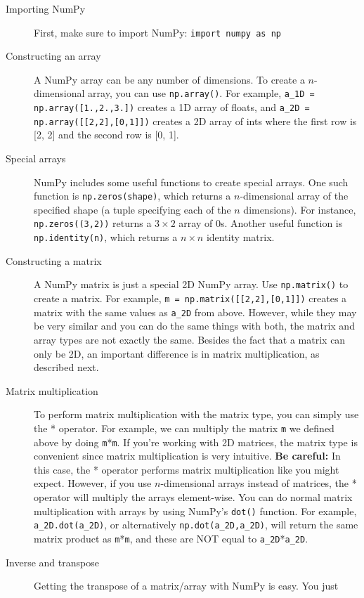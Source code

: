 \begin{description}
  \item[Importing NumPy] First, make sure to import NumPy: \texttt{import numpy as np}
  \item[Constructing an array] A NumPy array can be any number of dimensions. To create a
    $n$-dimensional array, you can use \texttt{np.array()}. For example, \texttt{a\_1D =
      np.array([1.,2.,3.])} creates a 1D array of floats, and \texttt{a\_2D =
    np.array([[2,2],[0,1]])} creates a 2D array of ints where the first row is [2, 2] and the second
    row is [0, 1].
  \item[Special arrays] NumPy includes some useful functions to create special arrays. One such
    function is \texttt{np.zeros(shape)}, which returns a $n$-dimensional array of the specified
    shape (a tuple specifying each of the $n$ dimensions). For instance, \texttt{np.zeros((3,2))}
    returns a $3 \times 2$ array of 0s. Another useful function is \texttt{np.identity(n)}, which
    returns a $n \times n$ identity matrix.
  \item[Constructing a matrix] A NumPy matrix is just a special 2D NumPy array. Use
    \texttt{np.matrix()} to create a matrix. For example, \texttt{m = np.matrix([[2,2],[0,1]])}
    creates a matrix with the same values as \texttt{a\_2D} from above. However, while they may be
    very similar and you can do the same things with both, the matrix and array types are not
    exactly the same. Besides the fact that a matrix can only be 2D, an important difference is in
    matrix multiplication, as described next.
  \item[Matrix multiplication] To perform matrix multiplication with the matrix type, you can simply
    use the * operator. For example, we can multiply the matrix \texttt{m} we defined above by doing
    \texttt{m}*\texttt{m}. If you're working with 2D matrices, the matrix type is convenient since
    matrix multiplication is very intuitive. \textbf{Be careful:} In this case, the * operator
    performs matrix multiplication like you might expect. However, if you use $n$-dimensional arrays
    instead of matrices, the * operator will multiply the arrays element-wise. You can do normal
    matrix multiplication with arrays by using NumPy's \texttt{dot()} function. For example,
    \texttt{a\_2D.dot(a\_2D)}, or alternatively \texttt{np.dot(a\_2D,a\_2D)}, will return the same
    matrix product as \texttt{m}*\texttt{m}, and these are NOT equal to
    \texttt{a\_2D}*\texttt{a\_2D}.
  \item[Inverse and transpose] Getting the transpose of a matrix/array with NumPy is easy. You just

\end{description}
